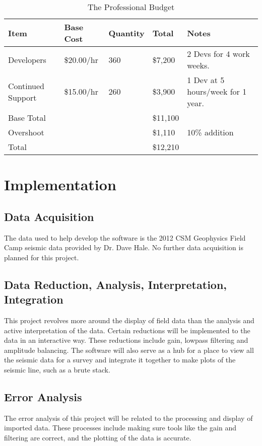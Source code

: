 \documentclass[11pt]{article}
\begin{document}
\begin{table}[H]
\caption{The Professional Budget}
\begin{tabular}{ l | l | l || l | l}
  \hline                        
  Item & Base Cost & Quantity & Total & Notes \\ \hline
  Developers & \$20.00/hr & 360 & \$7,200 & 2 Devs for 4 work weeks.\\
  Continued Support & \$15.00/hr & 260 & \$3,900 & 1 Dev at 5 hours/week for 1 year.\\ \hline
  Base Total & & & \$11,100 & \\
  Overshoot & & & \$1,110 & 10\% addition\\ \hline
  Total & & & \$12,210 & \\
  \hline  
\end{tabular} 
\end{table}

\section{Implementation}
\subsection{Data Acquisition}

The data used to help develop the software is the 2012 CSM Geophysics Field Camp seismic data provided by Dr. Dave Hale. No further data acquisition is planned for this project. 

\subsection{Data Reduction, Analysis, Interpretation, Integration}

This project revolves more around the display of field data than the analysis and active interpretation of the data. Certain reductions will be implemented to the data in an interactive way. These reductions include gain, lowpass filtering and amplitude balancing. The software will also serve as a hub for a place to view all the seismic data for a survey and integrate it together to make plots of the seismic line, such as a brute stack.

\subsection{Error Analysis}

The error analysis of this project will be related to the processing and display of imported data. These processes include making sure tools like the gain and filtering are correct, and the plotting of the data is accurate. \\
\end{document}
